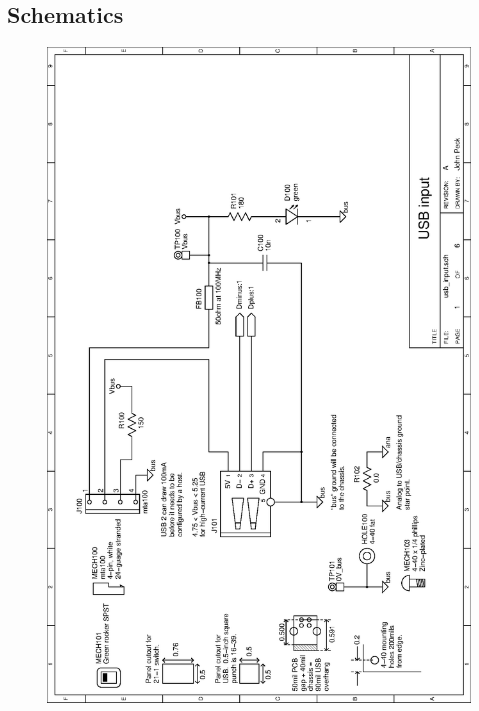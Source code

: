 \clearpage{}
\subsection{Schematics}

\begin{figure}[ht]
    \begin{center}
          \vspace{0.4cm}
          \includegraphics[clip,height=\textheight]
          {schematics/usb/usb_input}
          \label{sch:usb_input}
    \end{center} 
\end{figure}


